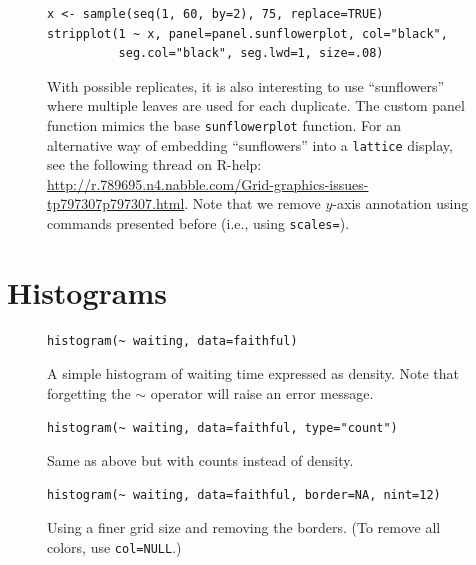 \documentclass[a4paper,twoside]{book}
\newcounter{fig}
\newcommand{\img}[1]{\texttt{[image: \#1]}\stepcounter{fig}}
\renewcommand{\texttt}[1]{\lstinline{#1}}
\newcommand{\mytilde}{\textcolor{myred3}{$\sim$}\xspace}
\begin{document}
\begin{figure}[H]
\begin{lstlisting}
x <- sample(seq(1, 60, by=2), 75, replace=TRUE)
stripplot(1 ~ x, panel=panel.sunflowerplot, col="black", 
          seg.col="black", seg.lwd=1, size=.08)
\end{lstlisting}
  \fcapside[\FBwidth] {\img{figs_lattice-crop}} {\caption*{With
      possible replicates, it is also interesting to use
      ``sunflowers'' where multiple leaves are used for each
      duplicate. The custom panel function mimics the base
      \texttt{sunflowerplot} function. For an alternative way of
      embedding ``sunflowers'' into a \texttt{lattice} display, see
      the following thread on R-help:
      \url{http://r.789695.n4.nabble.com/Grid-graphics-issues-tp797307p797307.html}. Note
    that we remove $y$-axis annotation using commands presented before
  (i.e., using \texttt{scales=}).}}
\end{figure}

\section{Histograms}
\lipsum[1]

\begin{figure}[H]
\begin{lstlisting}
histogram(~ waiting, data=faithful)
\end{lstlisting}
  \fcapside[\FBwidth] {\img{figs_lattice-crop}}
  {\caption*{A
      simple histogram of waiting time expressed as density. Note that
      forgetting the \mytilde operator will raise an error message.}}
\end{figure}

\begin{figure}[H]
\begin{lstlisting}
histogram(~ waiting, data=faithful, type="count")
\end{lstlisting}
  \fcapside[\FBwidth] {\img{figs_lattice-crop}}
  {\caption*{Same as above but with counts instead of density.}}
\end{figure}

\begin{figure}[H]
\begin{lstlisting}
histogram(~ waiting, data=faithful, border=NA, nint=12)
\end{lstlisting}
  \fcapside[\FBwidth] {\img{figs_lattice-crop}}
  {\caption*{Using a finer grid size and removing the borders. (To
      remove all colors, use \texttt{col=NULL}.)}}
\end{figure}
\end{document}
